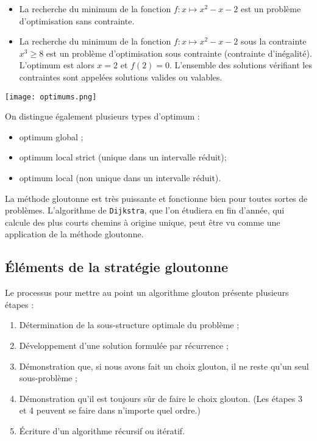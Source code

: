\begin{itemize}
	\item 	La recherche du minimum de la fonction $f:x \longmapsto x^2-x-2$ est un problème d’optimisation sans contrainte.
	\item		La recherche du minimum de la fonction $f:x \longmapsto x^2-x-2$ sous la contrainte $x^3\geq8$ est un problème d’optimisation sous contrainte (contrainte d’inégalité). L’optimum est alors $x=2$ et $f(2)=0$. L’ensemble des solutions vérifiant les contraintes sont appelées solutions valides ou valables.
\end{itemize}



\begin{marginfigure}
\texttt{[image: optimums.png]}
\end{marginfigure}


On distingue également plusieurs types d’optimum :
\begin{itemize}
	\item optimum global ;
	\item	optimum local strict (unique dans un intervalle réduit);
	\item	optimum local (non unique dans un intervalle réduit).
\end{itemize}

La méthode gloutonne est très puissante et fonctionne bien pour toutes sortes de problèmes. L'algorithme de \lstinline{Dijkstra}, que l'on étudiera en fin d'année, qui calcule des plus courts chemins à origine unique, peut être vu comme une application de la méthode gloutonne.

\subsection{\'Eléments de la stratégie gloutonne}

Le processus pour mettre au point un algorithme glouton présente plusieurs étapes :

\begin{enumerate}
\item Détermination de la sous-structure optimale du problème ;
\item Développement d'une solution formulée par récurrence ;
\item Démonstration que, si nous avons fait un choix glouton, il ne reste qu'un seul sous-problème ;
\item Démonstration qu'il est toujours sûr de faire le choix glouton. (Les étapes 3 et 4 peuvent se faire dans n'importe quel ordre.)
\item \'Ecriture d'un algorithme récursif ou itératif.
\end{enumerate}

